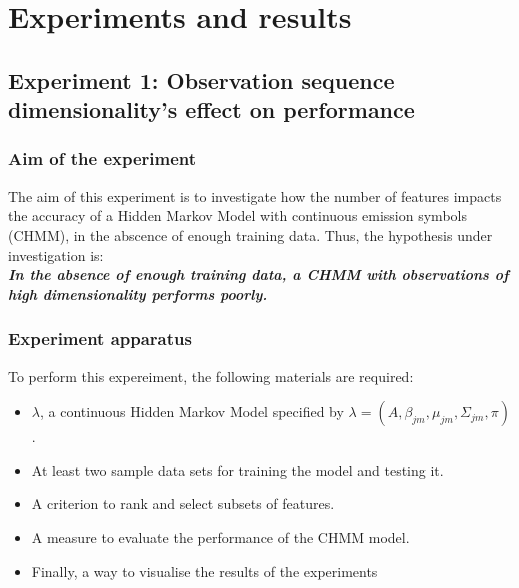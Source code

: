 \chapter{Experiments and results} \label{sec:results}

\section{Experiment 1: Observation sequence dimensionality's effect on performance} \label{exp:feat-size}

\subsection{Aim of the experiment}
The aim of this experiment is to investigate how the number of features impacts the accuracy of a Hidden Markov Model with continuous emission symbols (CHMM), in the abscence of enough training data. Thus, the hypothesis under investigation is:\\
\textbf{\textit{In the absence of enough training data, a CHMM with observations of high dimensionality performs poorly.}}

\subsection{Experiment apparatus}
To perform this expereiment, the following materials are required:
\begin{itemize}
	\item \(\lambda\), a continuous Hidden Markov Model specified by \(\lambda = (A, \beta_{jm}, \mu_{jm}, \Sigma_{jm}, \pi)\).
	\item At least two sample data sets for training the model and testing it.
	\item A criterion to rank and select subsets of features.
	\item A measure to evaluate the performance of the CHMM model.
	\item Finally, a way to visualise the results of the experiments
\end{itemize}

